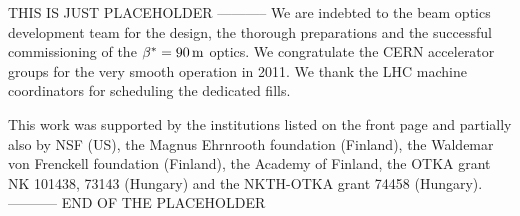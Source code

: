 \documentclass[pdftex,twocolumn,epjc3]{svjour3}
\def\un#1{\,{\rm #1}}
\begin{document}









\iffalse
\section{Conclusions}

new data - high statistics
new analysis - only irreducible unc. left - which ones
unprecedented precision in a range
data exclude pure exponential in that range, two methods, 7sigma
extended models for extrapolation to t=0, sigma\_tot compatible to previous TOTEM measurement
\fi


\begin{acknowledgements}
THIS IS JUST PLACEHOLDER -----------
We are indebted to the beam optics development team
for the design, the thorough preparations and the successful commissioning of the $\beta^* = 90\un{m}$ optics. We congratulate the CERN accelerator groups for the very smooth operation in 2011. We thank
the LHC machine coordinators for scheduling the dedicated fills.

This work was supported by the institutions listed on the front page and partially also by NSF (US), the Magnus
Ehrnrooth foundation (Finland), the Waldemar von Frenckell foundation (Finland), the Academy of
Finland, the OTKA grant NK 101438, 73143 (Hungary) and the NKTH-OTKA grant 74458 (Hungary).
----------- END OF THE PLACEHOLDER
\end{acknowledgements}
\end{document}
